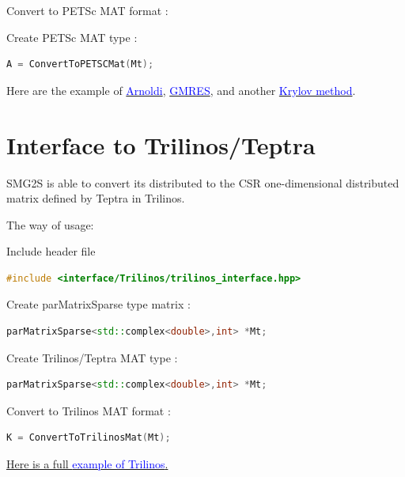 \documentclass[a4paper, 10 pt]{report}
\begin{document}
   Convert to PETSc MAT format :

	Create PETSc MAT type :
   \begin{lstlisting}[language=C,frame=single]
   A = ConvertToPETSCMat(Mt); 
   \end{lstlisting}

    Here are the example of \href{https://github.com/SMG2S/SMG2S/tree/master/example/arnoldi}{\textcolor{blue}{Arnoldi}}, \href{https://github.com/SMG2S/SMG2S/tree/master/example/gmres}{\textcolor{blue}{GMRES}}, and another  \href{https://github.com/SMG2S/SMG2S/tree/master/example/krylov}{\textcolor{blue}{Krylov method}}.
    
	\section{Interface to Trilinos/Teptra}
	
	SMG2S is able to convert its distributed to the CSR one-dimensional distributed matrix defined by Teptra in Trilinos.
	
	The way of usage:
	
	 Include header file

	\begin{lstlisting}[language=C++,frame=single]
   #include <interface/Trilinos/trilinos_interface.hpp>
	\end{lstlisting}
	
	Create parMatrixSparse type matrix :
	\begin{lstlisting}[language=C++,frame=single]
   parMatrixSparse<std::complex<double>,int> *Mt;
   \end{lstlisting}
	
	Create Trilinos/Teptra MAT type :
	\begin{lstlisting}[language=C++,frame=single]
   parMatrixSparse<std::complex<double>,int> *Mt;
	\end{lstlisting}

	Convert to Trilinos MAT format :
	\begin{lstlisting}[language=C++,frame=single]
   K = ConvertToTrilinosMat(Mt); 
	\end{lstlisting}

	\href{https://github.com/SMG2S/SMG2S/tree/master/example/teptra}{Here is a full \textcolor{blue}{ example of Trilinos}.}
	
	\newpage

\end{document}
